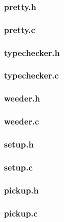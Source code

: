 \documentclass{article}
\begin{document}
\subsubsection{pretty.h}


\subsubsection{pretty.c}


\subsubsection{typechecker.h}


\subsubsection{typechecker.c}


\subsubsection{weeder.h}


\subsubsection{weeder.c}


\subsubsection{setup.h}


\subsubsection{setup.c}


\subsubsection{pickup.h}


\subsubsection{pickup.c}

\end{document}
